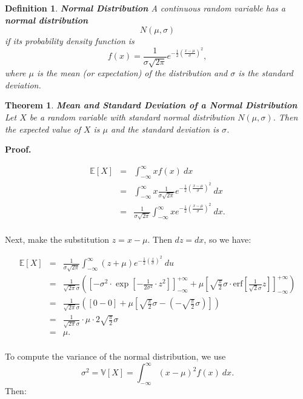 \documentclass[letterpaper,10pt]{article}
\newtheorem{thm}{Theorem}
\newtheorem{df}{Definition}[section]
\begin{document}
\begin{df}{\bf Normal Distribution}
A continuous random variable has a {\bf normal distribution} $$N(\mu,\sigma)$$ if its probability density function is $$f(x)=\frac{1}{\sigma\sqrt{2\pi}}e^{-\frac{1}{2}\left(\frac{x-\mu}{\sigma}\right)^2},$$ where $\mu$ is the mean (or expectation) of the distribution and $\sigma$ is the standard deviation.  
\end{df}

\begin{thm}{\bf Mean and Standard Deviation of a Normal Distribution}
Let $X$ be a random variable with standard normal distribution $N(\mu,\sigma)$. Then the expected value of $X$ is $\mu$ and the standard deviation is $\sigma$.
\end{thm}

\noindent\textbf{Proof.}

\begin{eqnarray*}
\mathbb{E}[X]&=&\int_{-\infty}^{\infty} x f(x)\:dx\\
&=&\int_{-\infty}^{\infty} x \frac{1}{\sigma\sqrt{2\pi}}e^{-\frac{1}{2}\left(\frac{x-\mu}{\sigma}\right)^2}\:dx\\
&=&\frac{1}{\sigma\sqrt{2\pi}}\int_{-\infty}^{\infty}xe^{-\frac{1}{2}\left(\frac{x-\mu}{\sigma}\right)^2}\:dx.\\
\end{eqnarray*}

\noindent Next, make the substitution $z=x-\mu$.  Then $dz=dx$, so we have:

\begin{eqnarray*}
\mathbb{E}[X]&=&\frac{1}{\sigma\sqrt{2\pi}}\int_{-\infty}^{\infty}(z+\mu)e^{-\frac{1}{2}\left(\frac{z}{\sigma}\right)^2}\:du\\
&=&\frac{1}{\sqrt{2 \pi} \sigma} \left( \left[ -\sigma^2 \cdot \exp \left[ -\frac{1}{2 \sigma^2} \cdot z^2 \right] \right]_{-\infty}^{+\infty} + \mu \left[ \sqrt{\frac{\pi}{2}} \sigma \cdot \mathrm{erf} \left[ \frac{1}{\sqrt{2} \sigma} z \right] \right]_{-\infty}^{+\infty} \right) \\
&= &\frac{1}{\sqrt{2 \pi} \sigma} \left( [0 - 0] + \mu \left[ \sqrt{\frac{\pi}{2}} \sigma - \left(- \sqrt{\frac{\pi}{2}} \sigma \right) \right] \right) \\
&= &\frac{1}{\sqrt{2 \pi} \sigma} \cdot \mu \cdot 2 \sqrt{\frac{\pi}{2}} \sigma \\
&=&\mu.\\
\end{eqnarray*}

To compute the variance of the normal distribution, we use $$\sigma^2=\mathbb{V}[X]=\int_{-\infty}^{\infty}(x-\mu)^2 f(x)\:dx.$$  Then:
\end{document}
